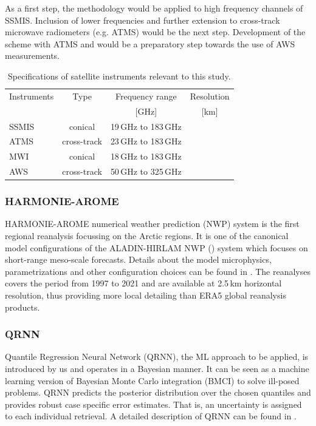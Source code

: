 \documentclass[12pt,oneside,a4paper]{article}
\begin{document}
As a first step, the methodology would be applied to high frequency channels of SSMIS. Inclusion of lower frequencies and further extension to cross-track microwave radiometers (e.g. ATMS) would be the next step. Development of the scheme with ATMS and would be a preparatory step towards the use of AWS measurements. 

\begin{table}[t]
	\centering
	\caption{Specifications of satellite instruments relevant to this study.}
	\label{tab:specifications_instruments}	
	\begin{tabular}{lccc}

		Instruments &Type& Frequency range 	& Resolution  \\
					&     & 	[GHz]				& [km]			\\
		\hline			
		SSMIS		&conical	&19\,GHz to 183\,GHz& \\
		ATMS        &cross-track&23\,GHz to 183\,GHz &\\
		\hline
		MWI         &conical     &18\,GHz to 183\,GHz&\\
		AWS         &cross-track &50\,GHz to 325\,GHz&\\ 
		
		\hline			

	\end{tabular}
\end{table}

\subsubsection{HARMONIE-AROME}
%
\label{sec:harmonie}
HARMONIE-AROME numerical weather prediction (NWP) system is the first regional reanalysis focussing on the Arctic regions. It is one of the canonical model configurations of the ALADIN-HIRLAM NWP () system which focuses on short-range meso-scale forecasts. Details about the model microphysics, parametrizations and other configuration choices can be found in \citep{bengtsson:2017:harmo}. The reanalyses covers the period from 1997 to 2021 and are available at 2.5\,km horizontal resolution, thus providing more local detailing than ERA5 global reanalysis products.  
 
\subsubsection{QRNN}
%
\label{sec:qrnn}

Quantile Regression Neural Network (QRNN), the ML approach to be applied, is introduced by us and operates in a Bayesian manner. It can be seen as a machine learning version of Bayesian Monte Carlo integration (BMCI) to solve ill-posed problems. QRNN predicts the posterior distribution over the chosen quantiles and provides robust case specific error estimates. That is, an uncertainty is assigned to each individual retrieval. A detailed description of QRNN can be found in \citet{pfreundschuh:aneur:18}. 
\end{document}
